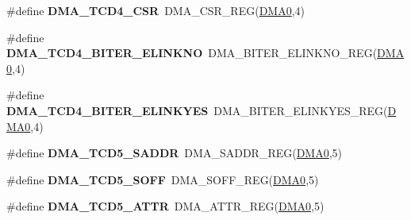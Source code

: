 \begin{DoxyCompactItemize}
\item 
\#define {\bfseries D\+M\+A\+\_\+\+T\+C\+D4\+\_\+\+C\+SR}~D\+M\+A\+\_\+\+C\+S\+R\+\_\+\+R\+EG(\hyperlink{group__DMA__Peripheral__Access__Layer_ga4103044f9ca209772f513dc694513ffb}{D\+M\+A0},4)\hypertarget{group__DMA__Register__Accessor__Macros_ga2a4c75adfdd4fccd9a457a92aab5ebb3}{}\label{group__DMA__Register__Accessor__Macros_ga2a4c75adfdd4fccd9a457a92aab5ebb3}

\item 
\#define {\bfseries D\+M\+A\+\_\+\+T\+C\+D4\+\_\+\+B\+I\+T\+E\+R\+\_\+\+E\+L\+I\+N\+K\+NO}~D\+M\+A\+\_\+\+B\+I\+T\+E\+R\+\_\+\+E\+L\+I\+N\+K\+N\+O\+\_\+\+R\+EG(\hyperlink{group__DMA__Peripheral__Access__Layer_ga4103044f9ca209772f513dc694513ffb}{D\+M\+A0},4)\hypertarget{group__DMA__Register__Accessor__Macros_ga026a693d34bf8ae3c371c5f4ce25e073}{}\label{group__DMA__Register__Accessor__Macros_ga026a693d34bf8ae3c371c5f4ce25e073}

\item 
\#define {\bfseries D\+M\+A\+\_\+\+T\+C\+D4\+\_\+\+B\+I\+T\+E\+R\+\_\+\+E\+L\+I\+N\+K\+Y\+ES}~D\+M\+A\+\_\+\+B\+I\+T\+E\+R\+\_\+\+E\+L\+I\+N\+K\+Y\+E\+S\+\_\+\+R\+EG(\hyperlink{group__DMA__Peripheral__Access__Layer_ga4103044f9ca209772f513dc694513ffb}{D\+M\+A0},4)\hypertarget{group__DMA__Register__Accessor__Macros_gac0e84c3dc53946dfd4bcd461b1620963}{}\label{group__DMA__Register__Accessor__Macros_gac0e84c3dc53946dfd4bcd461b1620963}

\item 
\#define {\bfseries D\+M\+A\+\_\+\+T\+C\+D5\+\_\+\+S\+A\+D\+DR}~D\+M\+A\+\_\+\+S\+A\+D\+D\+R\+\_\+\+R\+EG(\hyperlink{group__DMA__Peripheral__Access__Layer_ga4103044f9ca209772f513dc694513ffb}{D\+M\+A0},5)\hypertarget{group__DMA__Register__Accessor__Macros_ga32c1585febc1f3f13c83d52b7a48d57e}{}\label{group__DMA__Register__Accessor__Macros_ga32c1585febc1f3f13c83d52b7a48d57e}

\item 
\#define {\bfseries D\+M\+A\+\_\+\+T\+C\+D5\+\_\+\+S\+O\+FF}~D\+M\+A\+\_\+\+S\+O\+F\+F\+\_\+\+R\+EG(\hyperlink{group__DMA__Peripheral__Access__Layer_ga4103044f9ca209772f513dc694513ffb}{D\+M\+A0},5)\hypertarget{group__DMA__Register__Accessor__Macros_ga299ca77e3ea01fa9a38285be053705e0}{}\label{group__DMA__Register__Accessor__Macros_ga299ca77e3ea01fa9a38285be053705e0}

\item 
\#define {\bfseries D\+M\+A\+\_\+\+T\+C\+D5\+\_\+\+A\+T\+TR}~D\+M\+A\+\_\+\+A\+T\+T\+R\+\_\+\+R\+EG(\hyperlink{group__DMA__Peripheral__Access__Layer_ga4103044f9ca209772f513dc694513ffb}{D\+M\+A0},5)\hypertarget{group__DMA__Register__Accessor__Macros_ga731feb22fa7733ad23173ed440d37836}{}\label{group__DMA__Register__Accessor__Macros_ga731feb22fa7733ad23173ed440d37836}


\end{DoxyCompactItemize}
